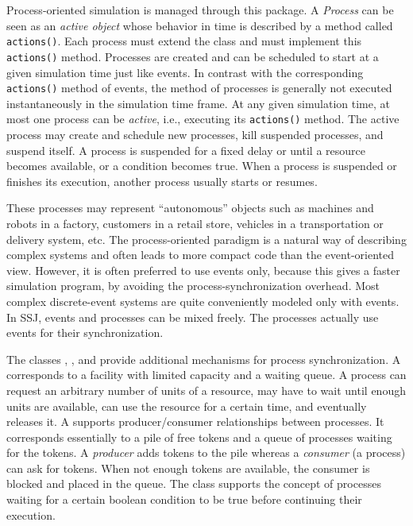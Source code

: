 \latex{\label {sec:overview}}

Process-oriented simulation is managed through this package.  
A \emph{Process} can be seen as an \emph{active object} whose behavior in
time is described by a method called \texttt{actions()}.
Each process must extend the
 class and
must implement this \texttt{actions()} method.
Processes are created and can be scheduled to start at a given 
simulation time just like events.
In contrast with the corresponding \texttt{actions()} method of events,
the method of processes is generally not executed instantaneously in the 
simulation time frame.
At any given simulation time, at most one process can be \emph{active}, 
i.e., executing its \texttt{actions()} method.
The active process may create and schedule new processes,
kill suspended processes, and suspend itself.  A process is suspended
for a fixed delay or until a resource becomes available, or a condition
becomes true.  When a process is suspended or finishes its execution,
another process usually starts or resumes.

These processes may represent ``autonomous'' objects 
such as machines and robots in a factory, 
customers in a retail store, 
vehicles in a transportation or delivery system, etc.
The process-oriented paradigm is a natural way of describing complex
systems \cite{sFRA77a,sBIR86a,sKRE86a,sLAW00a} and often leads to more 
compact code than the event-oriented view.
However, it is often preferred to use events only, because this gives a faster
simulation program, by avoiding the process-synchronization overhead.
Most complex discrete-event systems are quite conveniently modeled only 
with events.
In SSJ, events and processes can be mixed freely.
The processes actually use events for their synchronization.

The classes ,
, and
provide additional mechanisms for process synchronization.  
A  corresponds
to a facility with limited capacity and a waiting queue.
A process can request an arbitrary number of units of a resource,
may have to wait until enough units are available,
can use the resource for a certain time, and eventually releases it.
A  supports
producer/consumer relationships between processes.
It corresponds essentially to a pile of free tokens and a queue of 
processes waiting for the tokens.
A \emph{producer} adds tokens to the pile whereas a
\emph{consumer} (a process) can ask for tokens.
When not enough tokens are available, the consumer is blocked 
and placed in the queue.
The class 
supports the concept of processes waiting
for a certain boolean condition to be true before continuing their execution.

